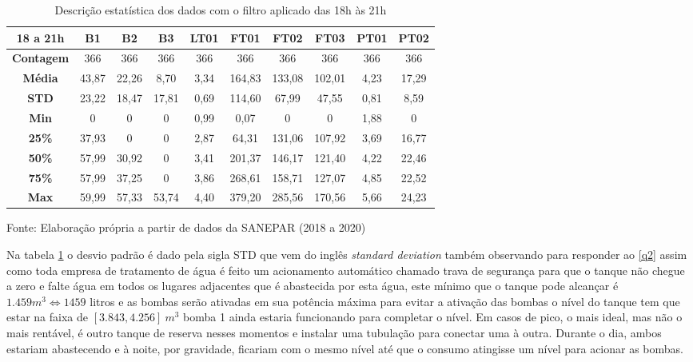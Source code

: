 \begin{table}[H]
	\centering
	\caption{Descrição estatística dos dados com o filtro aplicado das 18h às 21h}\label{tb:est}
	\begin{tabular}{@{}cccccccccc@{}}
		\toprule
		\textbf{18 a 21h}  & \textbf{B1} & \textbf{B2} & \textbf{B3} & \textbf{LT01} & \textbf{FT01} & \textbf{FT02} & \textbf{FT03} & \textbf{PT01} & \textbf{PT02} \\ \midrule
		\textbf{Contagem} & 366         & 366         & 366         & 366           & 366           & 366           & 366           & 366           & 366           \\
		\textbf{Média}    & 43,87       & 22,26       & 8,70        & 3,34          & 164,83        & 133,08        & 102,01        & 4,23          & 17,29         \\
		\textbf{STD}      & 23,22       & 18,47       & 17,81       & 0,69          & 114,60        & 67,99         & 47,55         & 0,81          & 8,59          \\
		\textbf{Min}      & 0           & 0           & 0           & 0,99          & 0,07          & 0             & 0             & 1,88          & 0             \\
		\textbf{25\%}     & 37,93       & 0           & 0           & 2,87          & 64,31         & 131,06        & 107,92        & 3,69          & 16,77         \\
		\textbf{50\%}     & 57,99       & 30,92       & 0           & 3,41          & 201,37        & 146,17        & 121,40        & 4,22          & 22,46         \\
		\textbf{75\%}     & 57,99       & 37,25       & 0           & 3,86          & 268,61        & 158,71        & 127,07        & 4,85          & 22,52         \\
		\textbf{Max}      & 59,99       & 57,33       & 53,74       & 4,40          & 379,20        & 285,56        & 170,56        & 5,66          & 24,23         \\ \bottomrule
\end{tabular}

	Fonte: Elaboração própria a partir de dados da SANEPAR (2018 a 2020)
\end{table}

Na tabela \ref{tb:est} o desvio padrão é dado pela sigla STD que vem do inglês \textit{standard deviation} também observando para responder ao \ref{q2} assim como toda empresa de tratamento de água é feito um acionamento automático chamado trava de segurança para que o tanque não chegue a zero e falte água em todos os lugares adjacentes que é abastecida por esta água, este mínimo que o tanque pode alcançar é $1.459 m^3\Longleftrightarrow 1459 $ litros e as bombas serão ativadas em sua potência máxima para evitar a ativação das bombas o nível do tanque tem que estar na faixa de $[3.843,4.256]\ m^3$ bomba 1 ainda estaria funcionando para completar o nível. Em casos de pico, o mais ideal, mas não o mais rentável, é outro tanque de reserva nesses momentos e instalar uma tubulação para conectar uma à outra. Durante o dia, ambos estariam abastecendo e à noite, por gravidade, ficariam com o mesmo nível até que o consumo atingisse um nível para acionar as bombas.  



